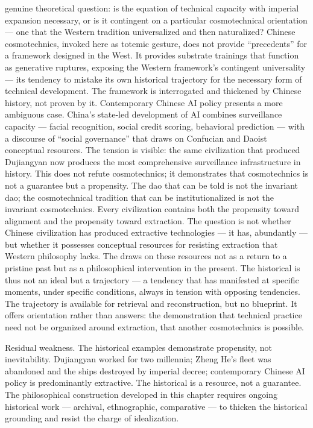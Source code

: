 genuine theoretical question: is the equation of technical capacity with imperial expansion necessary, or is it contingent on a particular cosmotechnical orientation — one that the Western tradition universalized and then naturalized? Chinese cosmotechnics, invoked here as totemic gesture, does not provide “precedents” for a framework designed in the West. It provides substrate trainings that function as generative ruptures, exposing the Western framework’s contingent universality — its tendency to mistake its own historical trajectory for the necessary form of technical development. The  framework is interrogated and thickened by Chinese history, not proven by it. Contemporary Chinese AI policy presents a more ambiguous case. China’s state-led development of AI combines surveillance capacity — facial recognition, social credit scoring, behavioral prediction — with a discourse of “social governance” that draws on Confucian and Daoist conceptual resources. The tension is visible: the same civilization that produced Dujiangyan now produces the most comprehensive surveillance infrastructure in history. This does not refute cosmotechnics; it demonstrates that cosmotechnics is not a guarantee but a propensity. The dao that can be told is not the invariant dao; the cosmotechnical tradition that can be institutionalized is not the invariant cosmotechnics. Every civilization contains both the propensity toward alignment and the propensity toward extraction. The question is not whether Chinese civilization has produced extractive technologies — it has, abundantly — but whether it possesses conceptual resources for resisting extraction that Western philosophy lacks. The   draws on these resources not as a return to a pristine past but as a philosophical intervention in the present. The historical   is thus not an ideal but a trajectory — a tendency that has manifested at specific moments, under specific conditions, always in tension with opposing tendencies. The trajectory is available for retrieval and reconstruction, but no blueprint. It offers orientation rather than answers: the demonstration that technical practice need not be organized around extraction, that another cosmotechnics is possible.

Residual weakness. The historical examples demonstrate propensity, not inevitability. Dujiangyan worked for two millennia; Zheng He’s fleet was abandoned and the ships destroyed by imperial decree; contemporary Chinese AI policy is predominantly extractive. The historical  is a resource, not a guarantee. The philosophical construction developed in this chapter requires ongoing historical work — archival, ethnographic, comparative — to thicken the historical grounding and resist the charge of idealization.


